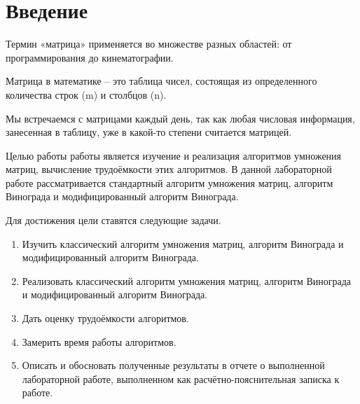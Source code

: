 \chapter*{Введение}

Термин «матрица» применяется во множестве разных областей: от
программирования до кинематографии.

Матрица в математике – это таблица чисел, состоящая из определенного количества строк (m) и столбцов (n).

Мы встречаемся с матрицами каждый день, так как любая числовая информация, занесенная в таблицу, уже в какой-то степени считается матрицей.


Целью работы работы является изучение и реализация алгоритмов
умножения матриц, вычисление трудоёмкости этих алгоритмов. В данной
лабораторной работе рассматривается стандартный алгоритм умножения
матриц, алгоритм Винограда и модифицированный алгоритм Винограда.


Для достижения цели ставятся следующие задачи.


\begin{enumerate}
	\item Изучить классический алгоритм умножения матриц, алгоритм Винограда и модифицированный алгоритм Винограда.
	\item Реализовать классический алгоритм умножения матриц, алгоритм
	Винограда и модифицированный алгоритм Винограда.

	\item Дать оценку трудоёмкости алгоритмов.
	\item Замерить время работы алгоритмов.
	\item Описать и обосновать полученные результаты в отчете о выполненной лабораторной работе, выполненном как расчётно-пояснительная
	записка к работе.
\end{enumerate}
